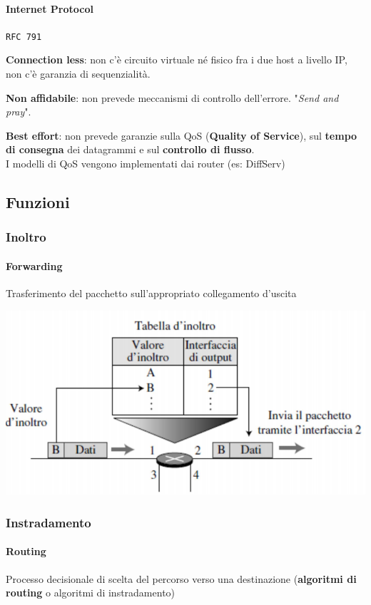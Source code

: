 \documentclass[10pt]{article}
\begin{document}
\paragraph{Internet Protocol} \texttt{RFC 791}
\begin{list}{}{Caratteristiche:}
\item \textbf{Connection less}: non c'è circuito virtuale né fisico fra i due host a livello IP, non c'è garanzia di sequenzialità.
\item \textbf{Non affidabile}: non prevede meccanismi di controllo dell'errore. "\textit{Send and pray}".
\item \textbf{Best effort}: non prevede garanzie sulla QoS (\textbf{Quality of Service}), sul \textbf{tempo di consegna} dei datagrammi e sul \textbf{controllo di flusso}.\\
I modelli di QoS vengono implementati dai router (es: DiffServ)
\end{list}
\subsection{Funzioni}
\subsubsection{Inoltro}
\paragraph{Forwarding} Trasferimento del pacchetto sull'appropriato collegamento d'uscita
\begin{center}
\includegraphics[scale=0.7]{ipforwarding.png}
\end{center}
\subsubsection{Instradamento}
\paragraph{Routing} Processo decisionale di scelta del percorso verso una destinazione (\textbf{algoritmi di routing} o algoritmi di instradamento)
\end{document}
